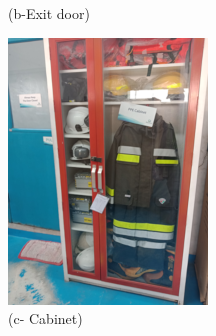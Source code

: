 \begin{figure}[h]
\begin{minipage}[b]{0.22\linewidth}
	\caption*{(b-Exit door)}
\end{minipage}
	\hspace{0.03cm}
\begin{minipage}[b]{0.22\linewidth}
	\centering
	\includegraphics[width=\textwidth]{figures/ch04_fig_safety05}
	\caption*{(c- Cabinet)}
\end{minipage}
	\hspace{0.03cm}
\begin{minipage}[b]{0.22\linewidth}
	\centering

\end{minipage}
\end{figure}
